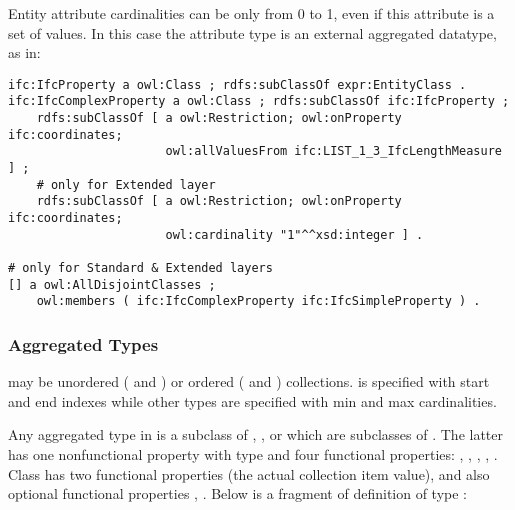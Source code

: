 Entity attribute cardinalities can be only from 0 to 1, even if this attribute is a set of values. In this case the attribute type is an external aggregated data\-type, as in:

\begin{lstlisting}
ifc:IfcProperty a owl:Class ; rdfs:subClassOf expr:EntityClass .
ifc:IfcComplexProperty a owl:Class ; rdfs:subClassOf ifc:IfcProperty ;
    rdfs:subClassOf [ a owl:Restriction; owl:onProperty ifc:coordinates;
                      owl:allValuesFrom ifc:LIST_1_3_IfcLengthMeasure ] ;
    # only for Extended layer
    rdfs:subClassOf [ a owl:Restriction; owl:onProperty ifc:coordinates;
                      owl:cardinality "1"^^xsd:integer ] .

# only for Standard & Extended layers
[] a owl:AllDisjointClasses ;
    owl:members ( ifc:IfcComplexProperty ifc:IfcSimpleProperty ) .
\end{lstlisting}


\subsubsection{Aggregated Types} may be unordered ( and ) or  ordered ( and ) collections. %
 is specified with start and end indexes while other types are specified with min and max cardinalities.

Any aggregated type in \ifcowl{} is a subclass of ,
,  or  which are subclasses of . The latter has one nonfunctional property  with type  and four functional properties: , , , , . Class  has two functional properties  (the actual collection item value),  and also optional functional properties , . Below is a fragment of definition of type :

